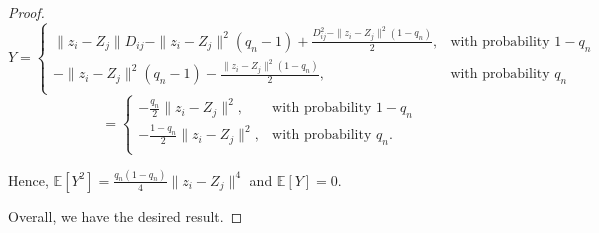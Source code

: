 \begin{proof}
  \[
    Y = 
    \begin{cases}
         \|z_i - Z_j \|D_{ij} - \|z_i - Z_j \|^2 (q_n -1) + \frac{D_{ij}^2 - \|z_i - Z_j\|^2 (1-q_n)}{2}, & \text{with probability } 1-q_n\\
        -\| z_i - Z_j\|^2(q_n-1) - \frac{\|z_i - Z_j\|^2 (1-q_n)   }{2}, & \text{with probability } q_n\\
     \end{cases} 
 \]
 \[
    = 
      \begin{cases}   
           -\frac{q_n}{2} \|z_i - Z_j \|^2, & \text{with probability } 1-q_n\\
           - \frac{1-q_n}{2} \|z_i-Z_j\|^2, & \text{with probability } q_n.\\
      \end{cases}
\]

Hence, $\mathbb{E}[ Y^2] = \frac{q_n(1-q_n)}{4} \|z_i - Z_j\|^4$ and $\mathbb{E}[Y] = 0$.

Overall, we have the desired result.
\end{proof}

